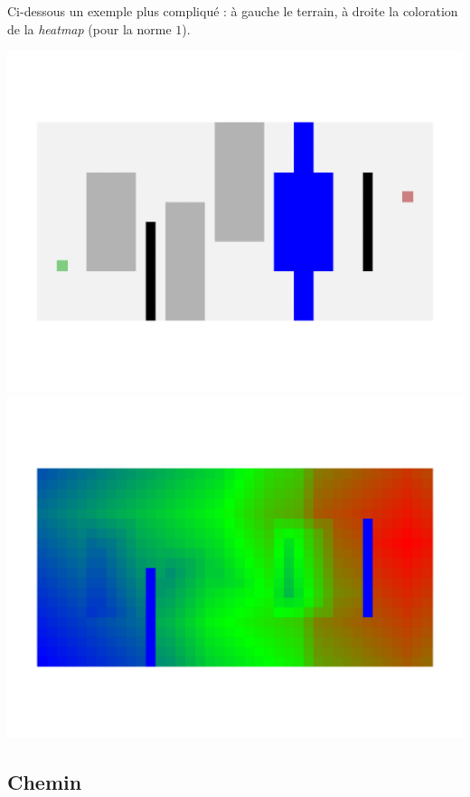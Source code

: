 \documentclass[11pt,class=report,crop=false]{standalone}
\begin{document}
Ci-dessous un exemple plus compliqué : à gauche le terrain, à droite la coloration de la \emph{heatmap} (pour la norme $1$).

\begin{center}
	\includegraphics[scale=\myscale,scale=0.5,trim={0 2cm 0 2cm},clip]{figures/terrain-02-1}
	\includegraphics[scale=\myscale,scale=0.5,trim={0 2cm 0 2cm},clip]{figures/terrain-02-2}
\end{center}


\subsection{Chemin}
\end{document}
